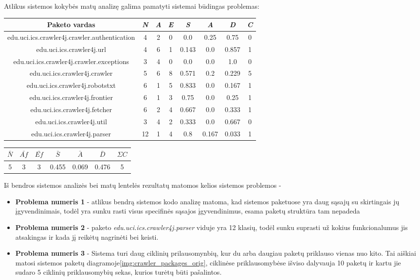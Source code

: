 Atlikus sistemos kokybės matų analizę galima pamatyti sistemai būdingas problemas:
\begin{center}
    \begin{tabular}{|c|c|c|c|c|c|c|c|}
        \hline
        Paketo vardas & \textit{N} & \textit{A} & \textit{E} & \textit{S} & \textit{A} & \textit{D} & \textit{C} \\ [0.5ex]
        \hline\hline
        edu.uci.ics.crawler4j.crawler.authentication & 4 & 2 & 0 & 0.0 & 0.25 & 0.75 & 0\\
        \hline
        edu.uci.ics.crawler4j.url & 4 & 6 & 1 & 0.143 & 0.0 & 0.857 & 1 \\
        \hline
        edu.uci.ics.crawler4j.crawler.exceptions & 3 & 4 & 0 & 0.0 & 0.0 & 1.0 & 0\\
        \hline
        edu.uci.ics.crawler4j.crawler & 5 & 6 & 8 & 0.571 & 0.2 & 0.229 & 5 \\
        \hline
        edu.uci.ics.crawler4j.robotstxt & 6 & 1 & 5 & 0.833 & 0.0 & 0.167 & 1 \\
        \hline
        edu.uci.ics.crawler4j.frontier & 6 & 1 & 3 & 0.75 & 0.0 & 0.25 & 1 \\
        \hline
        edu.uci.ics.crawler4j.fetcher & 6 & 2 & 4 & 0.667 & 0.0 & 0.333 & 1 \\
        \hline
        edu.uci.ics.crawler4j.util & 3 & 4 & 2 & 0.333 & 0.0 & 0.667 & 0 \\
        \hline
        edu.uci.ics.crawler4j.parser & 12 & 1 & 4 & 0.8 & 0.167 & 0.033 & 1 \\
        \hline
    \end{tabular}
    \begin{tabular}{|c|c|c|c|c|c|c|}
        \hline
        $\bar{N}$ & $\bar{Af}$ & $\bar{Ef}$ & $\bar{S}$ & $\bar{A}$ & $\bar{D}$ & $\Sigma C$  \\ [0.5ex]
        \hline\hline
        5 & 3 & 3 & 0.455 & 0.069 & 0.476 & 5\\
        \hline
    \end{tabular}
\end{center}
Iš bendros sistemos analizės bei matų lentelės rezultatų matomos kelios sistemos problemos -
\begin{itemize}
    \item \textbf{Problema numeris 1} - atlikus bendrą sistemos kodo analizę matoma,
    kad sistemos paketuose yra daug sąsajų su skirtingais jų įgyvendinimais, todėl yra sunku
    rasti visus specifinės sąsajos įgyvendinimus, esama paketų struktūra tam nepadeda
    \item \textbf{Problema numeris 2} - paketo \textit{edu.uci.ics.crawler4j.parser} viduje yra 12 klasių, todėl sunku suprasti už kokius funkcionalumus jis atsakingas
    ir kada jį reikėtų nagrinėti bei keisti.
    \item \textbf{Problema numeris 3} - Sistema turi daug ciklinių prilausomynbių, kur du arba daugiau paketų priklauso vienas nuo kito.
    Tai aiškiai matosi sistemos paketų diagramoje\ref{img:crawler_packages_orig}, ciklinėse priklausomybėse išviso dalyvauja 10 paketų ir kartu jie sudaro 5 ciklinių priklausomybių sekas,
    kurios turėtų būti pašalintos.
\end{itemize}

